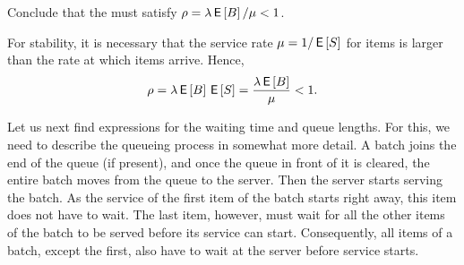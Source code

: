 \begin{exercise}
Conclude that   the  must satisfy
$\rho = \lambda \,\mathsf{E}\left[B\right]/\mu < 1$.
\begin{solution}
For stability, it is necessary that the service rate
$\mu=1/\,\mathsf{E}\left[S\right]$ for items is larger than the rate at which items
arrive.  Hence,
\begin{equation*}
\rho = \lambda \,\mathsf{E}\left[B\right] \,\mathsf{E}\left[S\right] = \frac{\lambda \,\mathsf{E}\left[B\right]} \mu < 1.
\end{equation*}
\end{solution}
\end{exercise}

Let us next find expressions for the waiting time and queue lengths. For this, we need to describe the queueing process in somewhat more detail. A batch joins the end of the queue (if present), and once the queue in front of it is cleared, the entire batch moves from the queue to the server. Then the server starts serving the batch. As the service of the first item of the batch starts right away, this item does not have to wait. The last item, however, must wait for all the other items of the batch to be served before its service can start. Consequently, all items of a batch, except the first, also have to wait at the server before service starts. 


